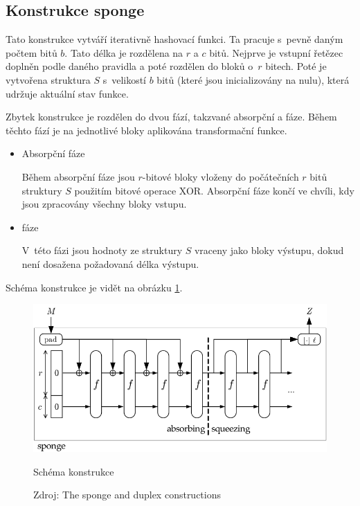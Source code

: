 \documentclass[titlepage,a4paper,12pt]{article}
\begin{document}
\subsection{Konstrukce sponge}

Tato konstrukce vytváří iterativně hashovací funkci. Ta pracuje s~pevně daným počtem bitů \(b\). Tato délka je rozdělena na \(r\) a \(c\) bitů. Nejprve je vstupní řetězec doplněn podle daného pravidla a poté rozdělen do bloků o~\(r\) bitech. Poté je vytvořena struktura \(S\) s~velikostí \(b\) bitů (které jsou inicializovány na nulu), která udržuje aktuální stav funkce. \par
Zbytek konstrukce je rozdělen do dvou fází, takzvané absorpční a  fáze. Během těchto fází je na jednotlivé bloky aplikována transformační funkce.

\begin{itemize}
    \item{Absorpční fáze} \par
    Během absorpční fáze jsou \(r\)-bitové bloky vloženy do počátečních \(r\) bitů struktury \(S\) použitím bitové operace XOR. Absorpční fáze končí ve chvíli, kdy jsou zpracovány všechny bloky vstupu.
    \item{ fáze} \par
    V~této fázi jsou hodnoty ze struktury \(S\) vraceny jako bloky výstupu, dokud není dosažena požadovaná délka výstupu.
\end{itemize}

Schéma konstrukce je vidět na obrázku \ref{fig:sponge}.

\begin{figure}[ht]
\centering
\includegraphics[scale=0.7]{sponge.png}
\caption{Schéma konstrukce }
\caption{Zdroj: The sponge and duplex constructions \cite{sponge}}
\label{fig:sponge}
\end{figure}
\end{document}
